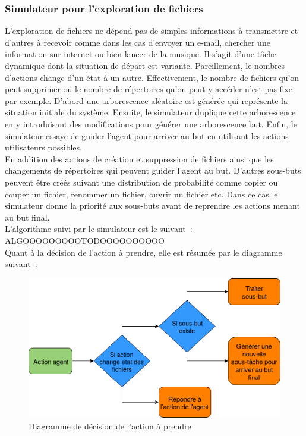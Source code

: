 	\subsubsection*{Simulateur pour l’exploration de fichiers}
	L’exploration de fichiers ne dépend pas de simples informations à transmettre et d’autres à recevoir comme dans les cas d’envoyer un e-mail, chercher une information sur internet ou bien lancer de la musique. Il s’agit d’une tâche dynamique dont la situation de départ est variante. Pareillement, le nombres d’actions change d’un état à un autre. Effectivement, le nombre de fichiers qu’on peut supprimer ou le nombre de répertoires qu’on peut y accéder n’est pas fixe par exemple.
	D’abord une arborescence aléatoire est générée qui représente la situation initiale du système. Ensuite, le simulateur duplique cette arborescence en y introduisant des modifications pour générer une arborescence but. Enfin, le simulateur essaye de guider l’agent pour arriver au but en utilisant les actions utilisateurs possibles.\\
	En addition des actions de création et suppression de fichiers ainsi que les changements de répertoires qui peuvent guider l’agent au but. D’autres sous-buts peuvent être créés suivant une distribution de probabilité comme copier ou couper un fichier, renommer un fichier, ouvrir un fichier etc. Dans ce cas le simulateur donne la priorité aux sous-buts avant de reprendre les actions menant au but final.\\
	L’algorithme suivi par le simulateur est le suivant :
	ALGOOOOOOOOOTODOOOOOOOOOO\\
	Quant à la décision de l’action à prendre, elle est résumée par le diagramme suivant :
	\begin{figure}[H] 
		\centering
		\includegraphics[width=0.8\linewidth]{images/Conception/DM/action_diag.png}
		\caption{Diagramme de décision de l'action à prendre}
		
	\end{figure}\label{action_diag}
